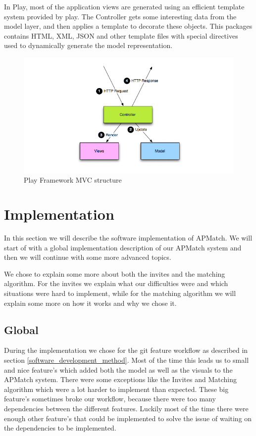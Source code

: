 In Play, most of the application views are generated using an efficient template system provided by play. 
The Controller gets some interesting data from the model layer, and then applies a template to decorate these objects. 
This packages contains HTML, XML, JSON and other template files with special directives used to dynamically generate the model representation.
\\
\begin{figure}[h]
  \centering
    \captionsetup{justification=centering}
    \includegraphics[width=\textwidth]{play_mvc}
    \caption{Play Framework MVC structure}
  \label{play_mvc_image}
\end{figure}


\section{Implementation}
In this section we will describe the software implementation of APMatch.
We will start of with a global implementation description of our APMatch system and then we will continue with some more advanced topics.

We chose to explain some more about both the invites and the matching algorithm.
For the invites we explain what our difficulties were and which situations were hard to implement, while for the matching algorithm we will explain some more on how it works and why we chose it.

\subsection{Global}
During the implementation we chose for the git feature workflow as described in section \ref{software_development_method}.
Most of the time this leads us to small and nice feature's which added both the model as well as the visuals to the APMatch system.
There were some exceptions like the Invites and Matching algorithm which were a lot harder to implement than expected.
These big feature's sometimes broke our workflow, because there were too many dependencies between the different features.
Luckily most of the time there were enough other feature's that could be implemented to solve the issue of waiting on the dependencies to be implemented.

